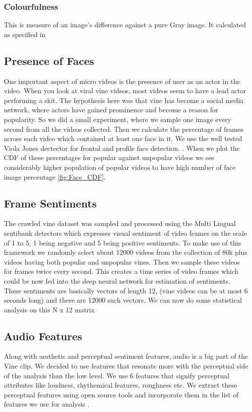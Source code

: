 \subsubsection{Colourfulness}
This is measure of an image's difference against a pure Gray image. It calculated as specified in \cite{yeh2010personalized}


\subsection{ Presence of Faces }
One important aspect of micro videos is the presence of user as an actor in the video. When you look at viral vine videos, most videos seem to have a lead actor performing a skit. The hypothesis here was that vine has become a social media network, where actors have gained prominence and become a reason for popularity. So we did a small experiment, where we sample one image every second from all the videos collected. Then we calculate the percentage of frames across each video which contained at least one face in it. We use the well tested Viola Jones dectector for frontal and profile face detection. \cite{viola2004robust}. When we plot the CDF of these percentages for popular against unpopular videos we see considerably higher population of popular videos to have high number of face image percentage \ref{fig:Face_CDF}.


\subsection{Frame Sentiments}

The crawled vine dataset was sampled and processed using the Multi Lingual sentibank detectors \cite{jou2015visual} which expresses visual sentiment of video feames on the scale of 1 to 5, 1 being negative and 5 being positive sentiments. To make use of this framework we randomly select about 12000 videos from the collection of 80k plus videos having both popular and unpopular vines. Then we sample these videos for frames twice every second. This creates a time series of video frames which could be now fed into the deep neural network for estimation of sentiments. These sentiments are basically vectors of length 12, (vine videos can be at most 6 seconds long) and there are 12000 such vectors. We can now do some statistical analysis on this N x 12 matrix


\subsection{Audio Features}
Along with aesthetic and perceptual sentiment features, audio is a big part of the Vine clip. We decided to use features that resonate more with the perceptual side of the analysis than the low level. We use 6 features that signify \cite{redi20146} perceptual attributes like loudness, rhythemical features, roughness etc. We extract these perceptual features using open source tools and incorporate them in the list of features we use for analysis \cite{lartillot2007matlab} \cite{laurier2009exploring}. 

